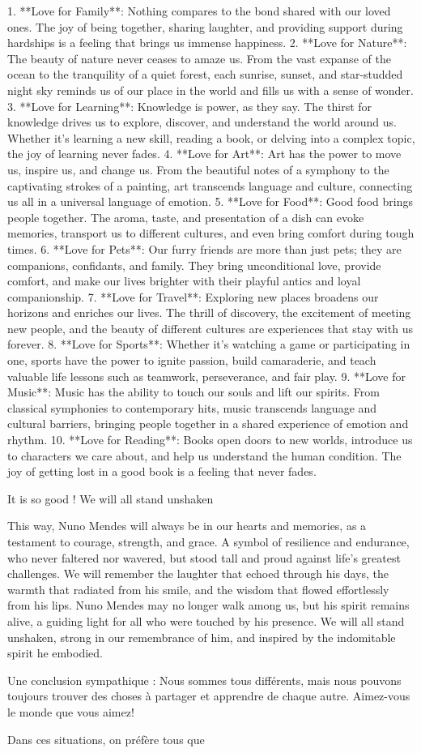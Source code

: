 \documentclass[12pt]{article}
\begin{document}
1. **Love for Family**: Nothing compares to the bond shared with our loved ones. The joy of being together, sharing laughter, and providing support during hardships is a feeling that brings us immense happiness. 2. **Love for Nature**: The beauty of nature never ceases to amaze us. From the vast expanse of the ocean to the tranquility of a quiet forest, each sunrise, sunset, and star-studded night sky reminds us of our place in the world and fills us with a sense of wonder. 3. **Love for Learning**: Knowledge is power, as they say. The thirst for knowledge drives us to explore, discover, and understand the world around us. Whether it's learning a new skill, reading a book, or delving into a complex topic, the joy of learning never fades. 4. **Love for Art**: Art has the power to move us, inspire us, and change us. From the beautiful notes of a symphony to the captivating strokes of a painting, art transcends language and culture, connecting us all in a universal language of emotion. 5. **Love for Food**: Good food brings people together. The aroma, taste, and presentation of a dish can evoke memories, transport us to different cultures, and even bring comfort during tough times. 6. **Love for Pets**: Our furry friends are more than just pets; they are companions, confidants, and family. They bring unconditional love, provide comfort, and make our lives brighter with their playful antics and loyal companionship. 7. **Love for Travel**: Exploring new places broadens our horizons and enriches our lives. The thrill of discovery, the excitement of meeting new people, and the beauty of different cultures are experiences that stay with us forever. 8. **Love for Sports**: Whether it's watching a game or participating in one, sports have the power to ignite passion, build camaraderie, and teach valuable life lessons such as teamwork, perseverance, and fair play. 9. **Love for Music**: Music has the ability to touch our souls and lift our spirits. From classical symphonies to contemporary hits, music transcends language and cultural barriers, bringing people together in a shared experience of emotion and rhythm. 10. **Love for Reading**: Books open doors to new worlds, introduce us to characters we care about, and help us understand the human condition. The joy of getting lost in a good book is a feeling that never fades.

It is so good ! We will all stand unshaken

This way, Nuno Mendes will always be in our hearts and memories, as a testament to courage, strength, and grace. A symbol of resilience and endurance, who never faltered nor wavered, but stood tall and proud against life's greatest challenges. We will remember the laughter that echoed through his days, the warmth that radiated from his smile, and the wisdom that flowed effortlessly from his lips. Nuno Mendes may no longer walk among us, but his spirit remains alive, a guiding light for all who were touched by his presence. We will all stand unshaken, strong in our remembrance of him, and inspired by the indomitable spirit he embodied.

Une conclusion sympathique : Nous sommes tous différents, mais nous pouvons toujours trouver des choses à partager et apprendre de chaque autre. Aimez-vous le monde que vous aimez!

Dans ces situations, on préfère tous que 
\end{document}
